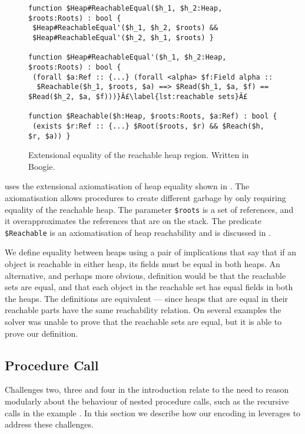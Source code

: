 \documentclass[runningheads,a4paper]{llncs}
\begin{document}
\begin{figure}[tbp]
\begin{lstlisting}[style=Boogie,firstnumber=auto,name=copyex]
function $Heap#ReachableEqual($h_1, $h_2:Heap, $roots:Roots) : bool {
 $Heap#ReachableEqual'($h_1, $h_2, $roots) &&
 $Heap#ReachableEqual'($h_2, $h_1, $roots) }

function $Heap#ReachableEqual'($h_1, $h_2:Heap, $roots:Roots) : bool {
 (forall $a:Ref :: {...} (forall <alpha> $f:Field alpha ::
  $Reachable($h_1, $roots, $a) ==> $Read($h_1, $a, $f) == $Read($h_2, $a, $f)))}Â£\label{lst:reachable sets}Â£

function $Reachable($h:Heap, $roots:Roots, $a:Ref) : bool {
 (exists $r:Ref :: {...} $Root($roots, $r) && $Reach($h, $r, $a)) }
\end{lstlisting}
\caption{Extensional equality of the reachable heap region. Written in Boogie.}\label{fig:extensionality}
\end{figure}

\Tool{} uses the extensional axiomatisation of heap equality shown in . The axiomatisation allows procedures to create different garbage by only requiring equality of the reachable heap. The parameter \texttt{\$roots} is a set of references, and it overapproximates the references that are on the stack. The predicate \texttt{\$Reachable} is an axiomatisation of heap reachability and is discussed in .

We define equality between heaps using a pair of implications that say that if an object is reachable in either heap, its fields must be equal in both heaps. An alternative, and perhaps more obvious, definition would be that the reachable sets are equal, and that each object in the reachable set has equal fields in both the heaps. The definitions are equivalent --- since heaps that are equal in their reachable parts have the same reachability relation. On several examples the solver was unable to prove that the reachable sets are equal, but it is able to prove our definition.

\subsection{Procedure Call}\label{sec:recursion}

Challenges two, three and four in the introduction relate to the need to reason modularly about the behaviour of nested procedure calls, such as the recursive calls in the example . In this section we describe how our encoding in  leverages \metho{} to address these challenges.
\end{document}
